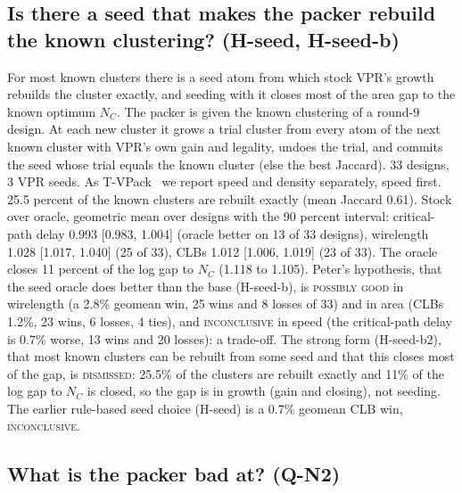 \subsection{Is there a seed that makes the packer rebuild the known clustering? (H-seed, H-seed-b)}
\label{sec:e-seed}

 For most known clusters there is a seed atom from which stock VPR's growth rebuilds the cluster exactly, and seeding with it closes most of the area gap to the known optimum $N_C$.
 The packer is given the known clustering of a round-9 design. At each new cluster it grows a trial cluster from every atom of the next known cluster with VPR's own gain and legality, undoes the trial, and commits the seed whose trial equals the known cluster (else the best Jaccard). 33 designs, 3 VPR seeds. As T-VPack~\cite{marquardt99cluster} we report speed and density separately, speed first. %
 25.5 percent of the known clusters are rebuilt exactly (mean Jaccard 0.61). Stock over oracle, geometric mean over designs with the 90 percent interval: critical-path delay 0.993 [0.983, 1.004] (oracle better on 13 of 33 designs), wirelength 1.028 [1.017, 1.040] (25 of 33), CLBs 1.012 [1.006, 1.019] (23 of 33). The oracle closes 11 percent of the log gap to $N_C$ (1.118 to 1.105).
 Peter's hypothesis, that the seed oracle does better than the base (H-seed-b), is \textsc{possibly good} in wirelength (a 2.8\% geomean win, 25 wins and 8 losses of 33) and in area (CLBs 1.2\%, 23 wins, 6 losses, 4 ties), and \textsc{inconclusive} in speed (the critical-path delay is 0.7\% worse, 13 wins and 20 losses): a trade-off. The strong form (H-seed-b2), that most known clusters can be rebuilt from some seed and that this closes most of the gap, is \textsc{dismissed}: 25.5\% of the clusters are rebuilt exactly and 11\% of the log gap to $N_C$ is closed, so the gap is in growth (gain and closing), not seeding. The earlier rule-based seed choice (H-seed) is a 0.7\% geomean CLB win, \textsc{inconclusive}.

\subsection{What is the packer bad at? (Q-N2)}
\label{sec:e-q2}

